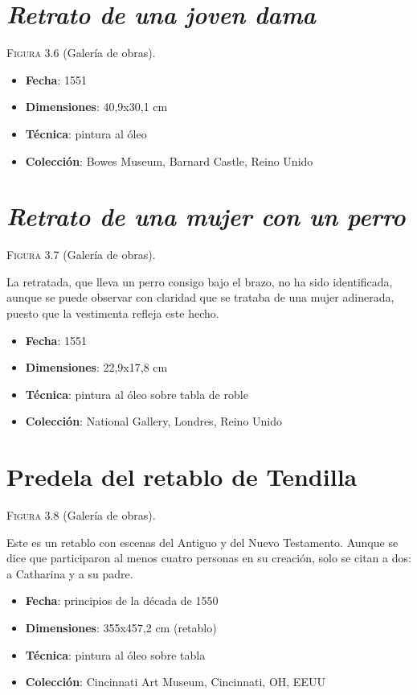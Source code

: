 \documentclass[12pt]{report}
\begin{document}
\section{\textit{Retrato de una joven dama}}

\textsc{Figura 3.6} (Galería de obras).\bigskip

\begin{itemize}
	\item \textbf{Fecha}: 1551
	\item \textbf{Dimensiones}: 40,9x30,1 cm
	\item \textbf{Técnica}: pintura al óleo
	\item \textbf{Colección}: Bowes Museum, Barnard Castle, Reino Unido
\end{itemize}

\section{\textit{Retrato de una mujer con un perro}}

\textsc{Figura 3.7} (Galería de obras).\bigskip

La retratada, que lleva un perro consigo bajo el brazo, no ha sido identificada, aunque se puede observar con claridad que se trataba de una mujer adinerada, puesto que la vestimenta refleja este hecho.
\begin{itemize}
	\item \textbf{Fecha}: 1551
	\item \textbf{Dimensiones}: 22,9x17,8 cm
	\item \textbf{Técnica}: pintura al óleo sobre tabla de roble
	\item \textbf{Colección}: National Gallery, Londres, Reino Unido
\end{itemize}

\section{Predela del retablo de Tendilla}

\textsc{Figura 3.8} (Galería de obras).\bigskip

Este es un retablo con escenas del Antiguo y del Nuevo Testamento. Aunque se dice que participaron al menos cuatro personas en su creación, solo se citan a dos: a Catharina y a su padre.
\begin{itemize}
	\item \textbf{Fecha}: principios de la década de 1550
	\item \textbf{Dimensiones}: 355x457,2 cm (retablo)
	\item \textbf{Técnica}: pintura al óleo sobre tabla
	\item \textbf{Colección}: Cincinnati Art Museum, Cincinnati, OH, EEUU
\end{itemize}
\end{document}
